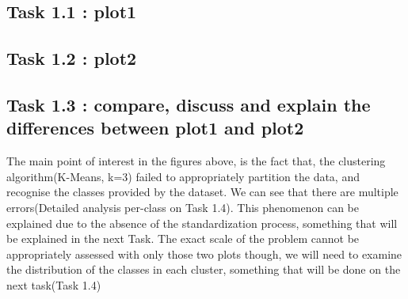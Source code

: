 \documentclass[11pt]{article}
\begin{document}
	\subsection*{Task 1.1 : plot1}

	 
	 \subsection*{Task 1.2 : plot2}

	 
	 \subsection*{Task 1.3 : compare, discuss and explain the differences between plot1 and plot2}
		The main point of interest in the figures above, is the fact that, the clustering algorithm(K-Means, k=3) failed to appropriately partition the data, and recognise the classes provided by the dataset. We can see that there are multiple errors(Detailed analysis per-class on Task 1.4). This phenomenon can be explained due to the absence of the standardization process, something that will be explained in the next Task. The exact scale of the problem cannot be appropriately assessed with only those two plots though, we will need to examine the distribution of the classes in each cluster, something that will be done on the next task(Task 1.4)
	
\end{document}
